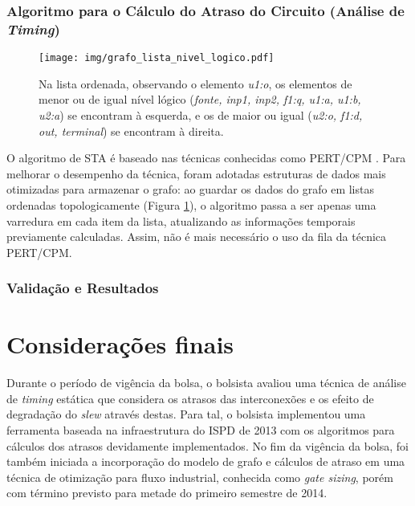 \documentclass[
	12pt,				%
	openright,			%
	twoside,			%
	a4paper,			%
	english,			%
	french,				%
	spanish,			%
	brazil,				%
	]{abntex2}
\begin{document}
\subsection{Algoritmo para o Cálculo do Atraso do Circuito (Análise de \textit{Timing})}

\begin{figure}[ht]
\begin{center}
\texttt{[image: img/grafo\_lista\_nivel\_logico.pdf]} 
\caption{Na lista ordenada, observando o elemento \textit{u1:o}, os elementos de menor ou de igual  nível lógico (\textit{fonte, inp1, inp2, f1:q, u1:a, u1:b, u2:a}) se encontram à esquerda, e os de maior ou igual (\textit{u2:o, f1:d, out, terminal}) se encontram à direita.}
\label{fig:grafo_lista_nivel_logico}
\end{center}
\end{figure}

O algoritmo de STA é baseado nas técnicas conhecidas como PERT/CPM \cite{BhaskerChadha09}. Para melhorar o desempenho da técnica, foram adotadas estruturas de dados mais otimizadas para armazenar o grafo: ao guardar os dados do grafo em listas ordenadas topologicamente (Figura \ref{fig:grafo_lista_nivel_logico}), o algoritmo passa a ser apenas uma varredura em cada item da lista, atualizando as informações temporais previamente calculadas. Assim, não é mais necessário o uso da fila da técnica PERT/CPM.

\subsection{Validação e Resultados}




\chapter*[Considerações finais]{Considerações finais}

Durante o período de vigência da bolsa, o bolsista avaliou uma técnica de análise de \textit{timing} estática que considera os atrasos das interconexões e os efeito de degradação do \textit{slew} através destas. Para tal, o bolsista implementou uma ferramenta baseada na infraestrutura do ISPD de 2013 \cite{Contest2013} com os algoritmos para cálculos dos atrasos devidamente implementados. No fim da vigência da bolsa, foi também iniciada a incorporação do modelo de grafo e cálculos de atraso em uma técnica de otimização para fluxo industrial, conhecida como \textit{gate sizing}, porém com término previsto para metade do primeiro semestre de 2014.



\postextual


\end{document}
